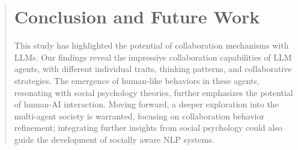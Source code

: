 \documentclass[11pt]{article}
\begin{document}
\begin{abstract}

\section{Conclusion and Future Work}
\label{sec:con_future}

This study has highlighted the potential of collaboration mechanisms with LLMs. Our findings reveal the impressive collaboration capabilities of LLM agents, with different individual traits, thinking patterns, and collaborative strategies. The emergence of human-like behaviors in these agents, resonating with social psychology theories, further emphasizes the potential of human-AI interaction. 
Moving forward, a deeper exploration into the multi-agent society is warranted, focusing on collaboration behavior refinement; integrating further insights from social psychology could also guide the development of socially aware NLP systems. 



% 

\end{abstract}
\end{document}
